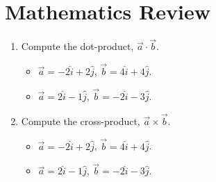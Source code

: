 \documentclass{article}
\begin{document}
\section{Mathematics Review}
\begin{enumerate}
\item Compute the dot-product, $\vec{a} \cdot \vec{b}$.
\begin{itemize}
\item $\vec{a} = -2\hat{i} + 2\hat{j}$, $\vec{b} = 4\hat{i} + 4\hat{j}$.
\item $\vec{a} = 2\hat{i} - 1\hat{j}$, $\vec{b} = -2\hat{i} - 3\hat{j}$.
\end{itemize}
\item Compute the cross-product, $\vec{a} \times \vec{b}$.
\begin{itemize}
\item $\vec{a} = -2\hat{i} + 2\hat{j}$, $\vec{b} = 4\hat{i} + 4\hat{j}$.
\item $\vec{a} = 2\hat{i} - 1\hat{j}$, $\vec{b} = -2\hat{i} - 3\hat{j}$.
\end{itemize}
\end{enumerate}
\end{document}
